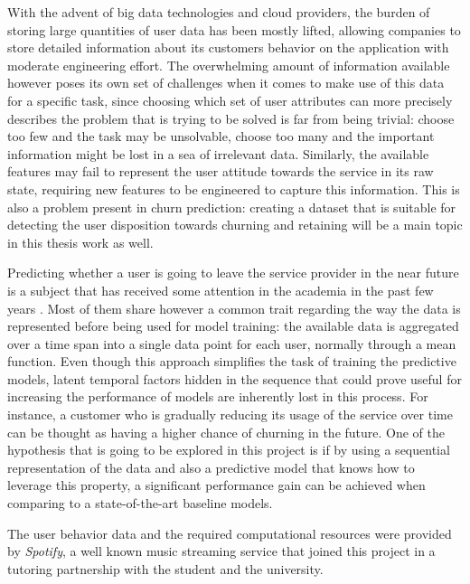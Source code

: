 \documentclass{kththesis}
\begin{document}
	With the advent of big data technologies and cloud providers, the burden of storing large quantities of user data has been mostly lifted, allowing companies to store detailed information about its customers behavior on the application with moderate engineering effort. The overwhelming amount of information available however poses its own set of challenges when it comes to make use of this data for a specific task, since choosing which set of user attributes can more precisely describes the problem that is trying to be solved is far from being trivial: choose too few and the task may be unsolvable, choose too many and the important information might be lost in a sea of irrelevant data. Similarly, the available features may fail to represent the user attitude towards the service in its raw state, requiring  new features to be engineered to capture this information. This is also a problem present in churn prediction: creating a dataset that is suitable for detecting the user disposition towards churning and retaining will be a main topic in this thesis work as well.
	
	Predicting whether a user is going to leave the service provider in the near future is a subject that has received some attention in the academia in the past few years \citep{Pudipeddi2014}\citep{GurAli2014}\citep{Drachen2016RapidPO}. Most of them share however a common trait regarding the way the data is represented before being used for model training: the available data is aggregated over a time span into a single data point for each user, normally through a mean function. Even though this approach simplifies the task of training the predictive models, latent temporal factors hidden in the sequence that could prove useful for increasing the performance of models are inherently lost in this process. For instance, a customer who is gradually reducing its usage of the service over time  can be thought as having a higher chance of churning in the future. One of the hypothesis that is going to be explored in this project is if by using a sequential representation of the data and also a predictive model that knows how to leverage this property, a significant performance gain can be achieved when comparing to a state-of-the-art baseline models. 
	 
	The user behavior data and the required computational resources were provided by \emph{Spotify}, a well known music streaming service that joined this project in a tutoring partnership with the student and the university. 
	
	
\end{document}
